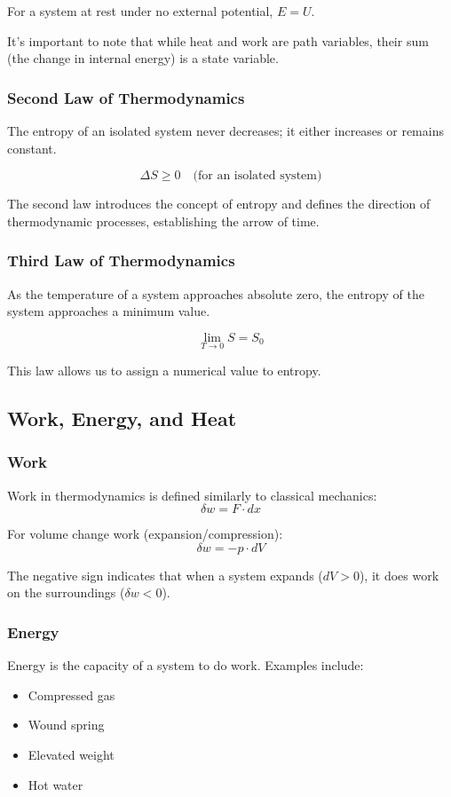 \documentclass{article}
\theoremstyle{definition}
\begin{document}
For a system at rest under no external potential, $E = U$.

It's important to note that while heat and work are path variables, their sum (the change in internal energy) is a state variable.

\subsubsection{Second Law of Thermodynamics}

The entropy of an isolated system never decreases; it either increases or remains constant.

\[
\Delta S \geq 0 \quad \text{(for an isolated system)}
\]

The second law introduces the concept of entropy and defines the direction of thermodynamic processes, establishing the arrow of time.

\subsubsection{Third Law of Thermodynamics}

As the temperature of a system approaches absolute zero, the entropy of the system approaches a minimum value.

\[
\lim_{T \to 0} S = S_0
\]

This law allows us to assign a numerical value to entropy.

\subsection{Work, Energy, and Heat}

\subsubsection{Work}
Work in thermodynamics is defined similarly to classical mechanics:
\[
\delta w = F \cdot dx
\]

For volume change work (expansion/compression):
\[
\delta w = -p \cdot dV
\]

The negative sign indicates that when a system expands ($dV > 0$), it does work on the surroundings ($\delta w < 0$).

\subsubsection{Energy}
Energy is the capacity of a system to do work. Examples include:
\begin{itemize}
    \item Compressed gas
    \item Wound spring
    \item Elevated weight
    \item Hot water
\end{itemize}
\end{document}

